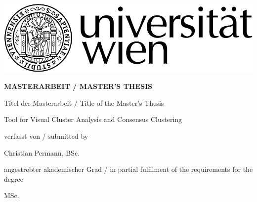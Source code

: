 \begin{titlepage}
\vspace*{-2cm}  %
\begin{flushright}
	\includegraphics[width=.5\textwidth]{titlepage/RZ_Logo_Uni_sw_01.jpg}
\end{flushright}
\vspace{1cm}

\begin{center}  %
    \huge{\textbf{\textsf{\MakeUppercase{
        MASTERARBEIT / MASTER'S THESIS
    }}}}
    \vspace{2cm}

    \large{\textsf{  %
        Titel der Masterarbeit / Title of the Master's Thesis
    }}
    \vspace{.1cm}

    \LARGE{\textsf{  %
        {\glqq}Tool for Visual Cluster Analysis and Consensus Clustering\grqq
    }}
    \vspace{2cm}

    \large{\textsf{  %
        verfasst von / submitted by
    }}

    \Large{\textsf{  %
        Christian Permann, BSc.
    }}
    \vspace{2cm}

    \large{\textsf{
        angestrebter akademischer Grad / in partial fulfilment of the requirements for the degree  %
    }}

    \Large{\textsf{  %
				MSc.
    }}
\end{center}
\vspace{2cm}


\end{titlepage}
